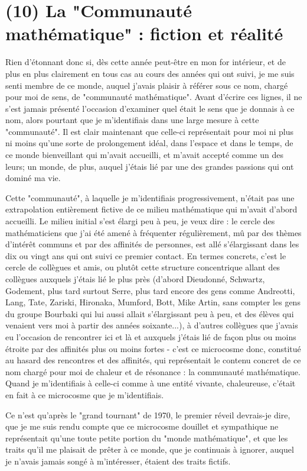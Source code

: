 \section{(10) La "Communauté mathématique" : fiction et réalité}

Rien d'étonnant donc si, dès cette année peut-être en mon for intérieur, et de plus en plus clairement en tous cas au cours des années qui ont suivi, je me suis senti membre de ce monde, auquel j'avais plaisir à référer sous ce nom, chargé pour moi de sens, de "communauté mathématique". Avant d'écrire ces lignes, il ne s'est jamais présenté l'occasion d'examiner quel était le sens que je donnais à ce nom, alors pourtant que je m'identifiais dans une large mesure à cette "communauté". Il est clair maintenant que celle-ci représentait pour moi ni plus ni moins qu'une sorte de prolongement idéal, dans l'espace et dans le temps, de ce monde bienveillant qui m'avait accueilli, et m'avait accepté comme un des leurs; un monde, de plus, auquel j'étais lié par une des grandes passions qui ont dominé ma vie.

Cette "communauté", à laquelle je m’identifiais progressivement, n'était pas une extrapolation entièrement fictive de ce milieu mathématique qui m'avait d'abord accueilli. Le milieu initial s'est élargi peu à peu, je veux dire : le cercle des mathématiciens que j'ai été amené à fréquenter régulièrement, mû par des thèmes d'intérêt communs et par des affinités de personnes, est allé s'élargissant dans les dix ou vingt ans qui ont suivi ce premier contact. En termes concrets, c'est le cercle de collègues et amis, ou plutôt cette structure concentrique allant des collègues auxquels j'étais lié le plus près (d'abord Dieudonné, Schwartz, Godement, plus tard surtout Serre, plus tard encore des gens comme Andreotti, Lang, Tate, Zariski, Hironaka, Mumford, Bott, Mike Artin, sans compter les gens du groupe Bourbaki qui lui aussi allait s'élargissant peu à peu, et des élèves qui venaient vers moi à partir des années soixante...), à d'autres collègues que j'avais eu l'occasion de rencontrer ici et là et auxquels j'étais lié de façon plus ou moins étroite par des affinités plus ou moins fortes - c'est ce microcosme donc, constitué au hasard des rencontres et des affinités, qui représentait le contenu concret de ce nom chargé pour moi de chaleur et de résonance : la communauté mathématique. Quand je m'identifiais à celle-ci comme à une entité vivante, chaleureuse, c'était en fait à ce microcosme que je m'identifiais.

Ce n'est qu'après le "grand tournant" de 1970, le premier réveil devrais-je dire, que je me suis rendu compte que ce microcosme douillet et sympathique ne représentait qu'une toute petite portion du "monde mathématique", et que les traits qu'il me plaisait de prêter à ce monde, que je continuais à ignorer, auquel je n'avais jamais songé à m'intéresser, étaient des traits fictifs.

